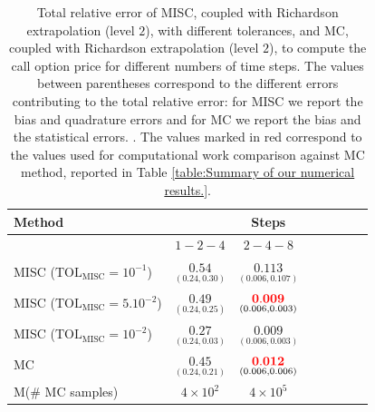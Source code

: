\begin{table}[!h]
	\centering
	\begin{tabular}{l*{6}{c}r}
		\toprule[1.5pt]
	Method & & Steps  & &     \\
	\hline
		        & $1-2-4$ & $2-4-8$  \\
		\hline

		MISC ($\text{TOL}_{\text{MISC}}=10^{-1}$)  & $\underset{(0.24,0.30)}{\mathbf{ 0.54
		}}$ & $\underset{(0.006,0.107)}{\mathbf{ 0.113}}$ \\
		MISC ($\text{TOL}_{\text{MISC}}=5.10^{-2}$)  & $\underset{(0.24,0.25)}{\mathbf{   0.49
		}}$ & $\underset{(0.006,0.003)}{\mathbf{ {\color{red}0.009}} }$  \\
		MISC ($\text{TOL}_{\text{MISC}}=10^{-2}$)  & $\underset{(0.24,0.03)}{\mathbf{ 0.27}}$ & $\underset{(0.006,0.003)}{\mathbf{ 0.009 }}$    \\	

			
				\hline
		MC   & $\underset{(0.24,0.21)}{\mathbf{0.45}}$  & $\underset{(0.006,0.006)}{\mathbf{{\color{red}0.012}}}$    \\
			M(\# MC samples) & $4 \times 10^2$  & $4 \times 10^5$   \\
		\bottomrule[1.25pt]
	\end{tabular}
	\caption{Total relative  error of MISC, coupled with Richardson extrapolation (level $2$), with different tolerances, and MC, coupled with Richardson extrapolation (level $2$), to compute the call option price for different numbers of time steps.  The values between parentheses correspond to the different errors contributing to the total relative error: for MISC we report the bias and quadrature errors and for MC we report the bias and the statistical errors. . The values marked in red correspond to the values used for computational work comparison against MC method, reported in Table \ref{table:Summary of our numerical results.}.}
	\label{Total  error of MISC and MC to compute Call option price of the different tolerances for different number of time steps. Case set $2$ parameters, with Richardson extrapolation(level $2$). The numbers between parentheses are the corresponding absolute errors,linear}
\end{table}
\FloatBarrier

